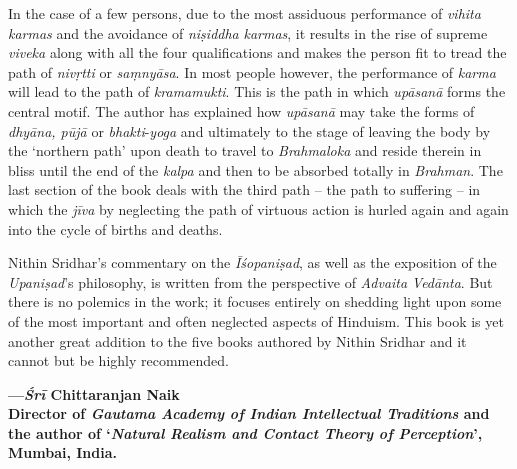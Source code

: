 In the case of a few persons, due to the most assiduous performance of \emph{vihita} \emph{karmas} and the avoidance of \emph{niṣiddha} \emph{karmas}, it results in the rise of supreme \emph{viveka} along with all the four qualifications and makes the person fit to tread the path of \emph{nivṛtti} or \emph{saṃnyāsa}. In most people however, the performance of \emph{karma} will lead to the path of \emph{kramamukti}. This is the path in which \emph{upāsanā} forms the central motif. The author has explained how \emph{upāsanā} may take the forms of \emph{dhyāna, pūjā} or \emph{bhakti}-\emph{yoga} and ultimately to the stage of leaving the body by the `northern path' upon death to travel to \emph{Brahmaloka} and reside therein in bliss until the end of the \emph{kalpa} and then to be absorbed totally in \emph{Brahman}. The last section of the book deals with the third path -- the path to suffering -- in which the \emph{jīva} by neglecting the path of virtuous action is hurled again and again into the cycle of births and deaths.

Nithin Sridhar's commentary on the \emph{Īśopaniṣad}, as well as the exposition of the \emph{Upaniṣad}'s philosophy, is written from the perspective of \emph{Advaita} \emph{Vedānta}. But there is no polemics in the work; it focuses entirely on shedding light upon some of the most important and often neglected aspects of Hinduism. This book is yet another great addition to the five books authored by Nithin Sridhar and it cannot but be highly recommended.
\bigskip

\begin{flushright}
\textbf{---\emph{Śrī} Chittaranjan Naik}\\
\textbf{Director of \emph{Gautama Academy of Indian Intellectual Traditions} and the author of `\emph{Natural Realism and Contact Theory of Perception}',}\\
\textbf{Mumbai, India.}
\end{flushright}
